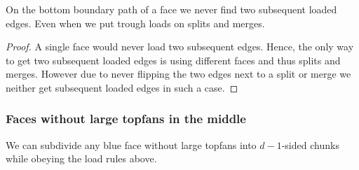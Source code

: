   \begin{lemma}
    \label{lm:}
    On the bottom boundary path of a face we never find two subsequent loaded edges. Even when we put trough loads on splits and merges.
  \end{lemma}
  \begin{proof}
    A single face would never load two subsequent edges. Hence, the only way to get two subsequent loaded edges is using different faces and thus splits and merges.
    However due to never flipping the two edges next to a split or merge we neither get subsequent loaded edges in such a case.
  \end{proof}


\subsubsection{Faces without large topfans in the middle}
  \begin{lemma}
    \label{lm:subdiv:withoutTopfan}
    We can subdivide any blue face without large topfans into $d-1$-sided chunks while obeying the load rules above.
  \end{lemma}

